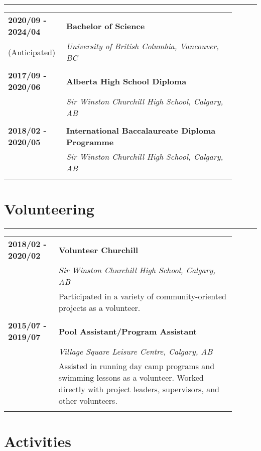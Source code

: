 \documentclass[letterpaper]{article}
\newcommand{\horizontalLine}{%
    \rule{\linewidth}{0.4pt}
    \vspace{1ex}
}
\begin{document}
        \horizontalLine

        \begin{tabular}{p{0.2\linewidth} p{0.7\linewidth}} 
            \textbf{2020/09 - 2024/04} & \large\textbf{Bachelor of Science} \\
            (Anticipated) & \emph{University of British Columbia, Vancouver, BC} \\
            \\
            \textbf{2017/09 - 2020/06} & \large\textbf{Alberta High School Diploma} \\
            & \emph{Sir Winston Churchill High School, Calgary, AB} \\
            \\
            \textbf{2018/02 - 2020/05} & \large\textbf{International Baccalaureate Diploma Programme} \\
            & \emph{Sir Winston Churchill High School, Calgary, AB} \\
            \\
        \end{tabular}

    \section*{Volunteering}

        \horizontalLine

        \begin{tabular}{p{0.2\linewidth} p{0.7\linewidth}} 
            \textbf{2018/02 - 2020/02} & \large\textbf{Volunteer Churchill} \\
            & \emph{Sir Winston Churchill High School, Calgary, AB} \\
            & Participated in a variety of community-oriented projects as a volunteer. \\
            \\
            \textbf{2015/07 - 2019/07} & \large\textbf{Pool Assistant/Program Assistant} \\
            & \emph{Village Square Leisure Centre, Calgary, AB} \\
            & Assisted in running day camp programs and swimming lessons as a volunteer.
            Worked directly with project leaders, supervisors, and other volunteers. \\
            \\
        \end{tabular}

    \section*{Activities}
\end{document}
